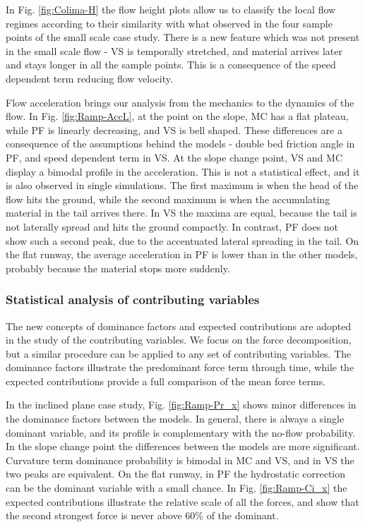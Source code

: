 \documentclass{article}
\begin{document}
In Fig. \ref{fig:Colima-H} the flow height plots allow us to classify the local flow regimes according to their similarity with what observed in the four sample points of the small scale case study. There is a new feature which was not present in the small scale flow - VS is temporally stretched, and material arrives later and stays longer in all the sample points. This is a consequence of the speed dependent term reducing flow velocity.

Flow acceleration brings our analysis from the mechanics to the dynamics of the flow. In Fig. \ref{fig:Ramp-AccL}, at the point on the slope, MC has a flat plateau, while PF is linearly decreasing, and VS is bell shaped. These differences are a consequence of the assumptions behind the models - double bed friction angle in PF, and speed dependent term in VS. At the slope change point, VS and MC display a bimodal profile in the acceleration. This is not a statistical effect, and it is also observed in single simulations. The first maximum is when the head of the flow hits the ground, while the second maximum is when the accumulating material in the tail arrives there. In VS the maxima are equal, because the tail is not laterally spread and hits the ground compactly. In contrast, PF does not show such a second peak, due to the accentuated lateral spreading in the tail. On the flat runway, the average acceleration in PF is lower than in the other models, probably because the material stops more suddenly.

\subsubsection{Statistical analysis of contributing variables}
The new concepts of dominance factors and expected contributions are adopted in the study of the contributing variables. We focus on the force decomposition, but a similar procedure can be applied to any set of contributing variables. The dominance factors illustrate the predominant force term through time, while the expected contributions provide a full comparison of the mean force terms.

In the inclined plane case study, Fig. \ref{fig:Ramp-Pr_x} shows minor differences in the dominance factors between the models. In general, there is always a single dominant variable, and its profile is complementary with the no-flow probability. In the slope change point the differences between the models are more significant. Curvature term dominance probability is bimodal in MC and VS, and in VS the two peaks are equivalent. On the flat runway, in PF the hydrostatic correction can be the dominant variable with a small chance. In Fig. \ref{fig:Ramp-Ci_x} the expected contributions illustrate the relative scale of all the forces, and show that the second strongest force is never above 60\% of the dominant.
\end{document}
